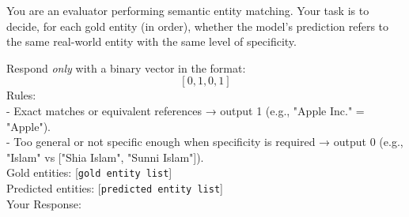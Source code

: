 \begin{tcolorbox}[colback=white, colframe=black, title=Prompt template for LLM-as-Judge, boxrule=0.5pt, left=2mm, right=2mm, top=0mm, bottom=0.5mm]
\footnotesize
\label{tab:llm_as_judge_prompt}
You are an evaluator performing semantic entity matching. Your task is to decide, for each gold entity (in order), whether the model's prediction refers to the same real-world entity with the same level of specificity. 

Respond \emph{only} with a binary vector in the format:
\[
[0, 1, 0, 1]
\]
Rules: \\
- Exact matches or equivalent references → output 1 (e.g., "Apple Inc." = "Apple"). \\
- Too general or not specific enough when specificity is required → output 0 (e.g., "Islam" vs ["Shia Islam", "Sunni Islam"]). \\[0.25em]
Gold entities: [\texttt{gold entity list}] \\
Predicted entities: [\texttt{predicted entity list}] \\
Your Response:
\end{tcolorbox}
